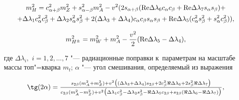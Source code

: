 \begin{multline} 

m^2_H=c^2_{\alpha+\beta} m^2_Z + s^2_{\alpha-\beta} m^2_A - v^2 (2 s_{\alpha+\beta} ({\mathop{\rm Re}}\Delta \lambda_6 c_{\alpha} c_{\beta}  +{\mathop{\rm Re}}\Delta \lambda_7 s_{\alpha} s_{\beta})+ \\

+\Delta  \lambda_1 c^2_{\alpha} c^2_{\beta} +\Delta  \lambda_2 s^2_{\alpha} s^2_{\beta}+ 2(\Delta  \lambda_3+\Delta  \lambda_4)c_{\alpha} c_{\beta} s_{\alpha} s_{\beta}+ {\mathop{\rm Re}}\Delta \lambda_5 (c^2_{\alpha} s^2_{\beta} +s^2_{\alpha} c^2_{\beta})), \label{eq:heavyH}

\end{multline}

\begin{equation}

m^2_{H^{\pm}} = m^2_W+m^2_A-\frac{v^2}{2}( {\mathop{\rm Re}} \Delta \lambda_5-  \Delta \lambda_4), \label{eq:mAmHpm}

\end{equation}

где $\Delta \lambda_i,$ $i=1, 2, \dots, 7$ "--- радиационные поправки к~параметрам на масштабе массы топ"=кварка $m_t$; $\alpha$ "--- угол смешивания, определяемый из выражения 







\begin{equation}

\begin{array}{c}

\tg (2 \alpha)= \frac{s_{2 \beta}(m_A^2+m_Z^2) +v^2\bigl((\Delta \lambda_3+\Delta \lambda_4)s_{2 \beta}+2 c^2_{\beta} \Re \Delta \lambda_6+2 s^2_{\beta} \Re \Delta \lambda_7\bigr) }

{

c_{2 \beta}(m_A^2-m_Z^2)+v^2\bigl(\Delta \lambda_1 c_\beta^2-\Delta \lambda_2 s_\beta^2-\Re \Delta \lambda_5 c_{2 \beta}+s_{2 \beta}(\Re \Delta \lambda_6 -\Re \Delta \lambda_7)\bigr)},

\end{array}

\end{equation}

